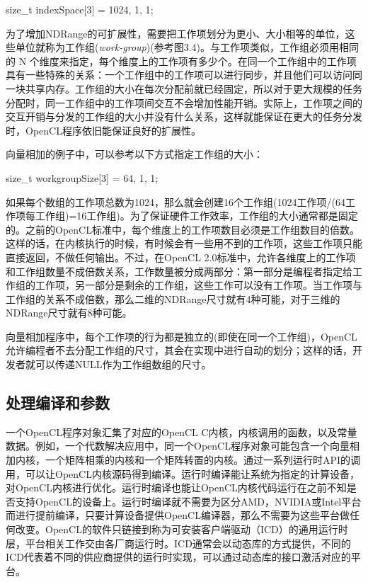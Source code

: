 \begin{codebox}[cpp]
size_t indexSpace[3] = {1024, 1, 1};
\end{codebox}

为了增加NDRange的可扩展性，需要把工作项划分为更小、大小相等的单位，这些单位就称为工作组(\emph{work-group})(参考图3.4)。与工作项类似，工作组必须用相同的 N 个维度来指定，每个维度上的工作项有多少个。在同一个工作组中的工作项具有一些特殊的关系：一个工作组中的工作项可以进行同步，并且他们可以访问同一块共享内存。工作组的大小在每次分配前就已经固定，所以对于更大规模的任务分配时，同一工作组中的工作项间交互不会增加性能开销。实际上，工作项之间的交互开销与分发的工作组的大小并没有什么关系，这样就能保证在更大的任务分发时，OpenCL程序依旧能保证良好的扩展性。


向量相加的例子中，可以参考以下方式指定工作组的大小：

\begin{codebox}[cpp]
size_t workgroupSize[3] = {64, 1, 1};
\end{codebox}

如果每个数组的工作项总数为1024，那么就会创建16个工作组(1024工作项/(64工作项每工作组)=16工作组)。为了保证硬件工作效率，工作组的大小通常都是固定的。之前的OpenCL标准中，每个维度上的工作项数目必须是工作组数目的倍数。这样的话，在内核执行的时候，有时候会有一些用不到的工作项，这些工作项只能直接返回，不做任何输出。不过，在OpenCL 2.0标准中，允许各维度上的工作项和工作组数量不成倍数关系，工作数量被分成两部分：第一部分是编程者指定给工作组的工作项，另一部分是剩余的工作组，这些工作可以没有工作项。当工作项与工作组的关系不成倍数，那么二维的NDRange尺寸就有4种可能，对于三维的NDRange尺寸就有8种可能。

向量相加程序中，每个工作项的行为都是独立的(即使在同一个工作组)，OpenCL允许编程者不去分配工作组的尺寸，其会在实现中进行自动的划分；这样的话，开发者就可以传递NULL作为工作组数组的尺寸。

\subsection{处理编译和参数}

一个OpenCL程序对象汇集了对应的OpenCL C内核，内核调用的函数，以及常量数据。例如，一个代数解决应用中，同一个OpenCL程序对象可能包含一个向量相加内核，一个矩阵相乘的内核和一个矩阵转置的内核。通过一系列运行时API的调用，可以让OpenCL内核源码得到编译。运行时编译能让系统为指定的计算设备，对OpenCL内核进行优化。运行时编译也能让OpenCL内核代码运行在之前不知是否支持OpenCL的设备上。运行时编译就不需要为区分AMD，NVIDIA或Intel平台而进行提前编译，只要计算设备提供OpenCL编译器，那么不需要为这些平台做任何改变。OpenCL的软件只链接到称为可安装客户端驱动（ICD）的通用运行时层，平台相关工作交由各厂商运行时。ICD通常会以动态库的方式提供，不同的ICD代表着不同的供应商提供的运行时实现，可以通过动态库的接口激活对应的平台。

